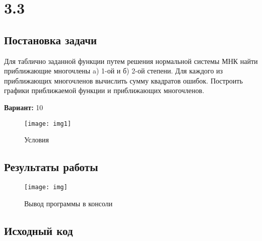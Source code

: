 \section* {3.3}

\subsection{Постановка задачи}
Для таблично заданной функции путем решения нормальной системы МНК найти приближающие многочлены a) 1-ой  и б) 2-ой степени. Для каждого из приближающих многочленов вычислить сумму квадратов ошибок. Построить графики приближаемой функции и приближающих многочленов.

{\bfseries Вариант:} 10
\begin{figure}[h!]
\centering
\texttt{[image: img1]}
\caption{Условия}
\end{figure}

\subsection{Результаты работы}
\begin{figure}[h!]
\centering
\texttt{[image: img]}
\caption{Вывод программы в консоли}
\end{figure}
\pagebreak


\subsection{Исходный код}
% 

% 
% 
% 